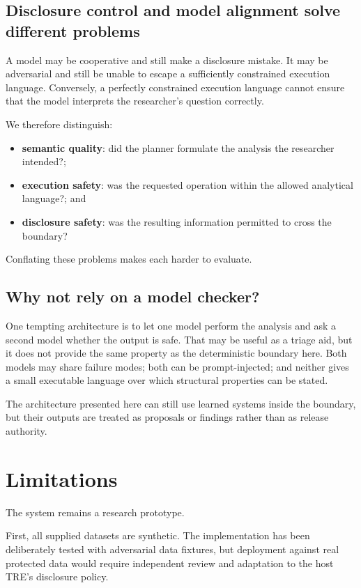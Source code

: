 \documentclass[11pt,a4paper]{article}
\begin{document}
\subsection{Disclosure control and model alignment solve different problems}

A model may be cooperative and still make a disclosure mistake. It may be
adversarial and still be unable to escape a sufficiently constrained execution
language. Conversely, a perfectly constrained execution language cannot ensure
that the model interprets the researcher's question correctly.

We therefore distinguish:

\begin{itemize}[leftmargin=*]
  \item \textbf{semantic quality}: did the planner formulate the analysis the
  researcher intended?;
  \item \textbf{execution safety}: was the requested operation within the
  allowed analytical language?; and
  \item \textbf{disclosure safety}: was the resulting information permitted to
  cross the boundary?
\end{itemize}

Conflating these problems makes each harder to evaluate.

\subsection{Why not rely on a model checker?}

One tempting architecture is to let one model perform the analysis and ask a
second model whether the output is safe. That may be useful as a triage aid, but
it does not provide the same property as the deterministic boundary here. Both
models may share failure modes; both can be prompt-injected; and neither gives a
small executable language over which structural properties can be stated.

The architecture presented here can still use learned systems inside the
boundary, but their outputs are treated as proposals or findings rather than as
release authority.

\section{Limitations}
\label{sec:limitations}

The system remains a research prototype.

First, all supplied datasets are synthetic. The implementation has been
deliberately tested with adversarial data fixtures, but deployment against real
protected data would require independent review and adaptation to the host
TRE's disclosure policy.
\end{document}
